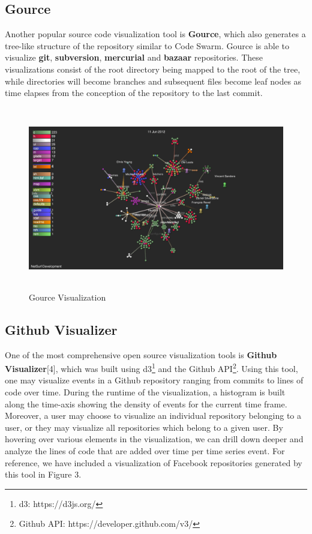 \documentclass{article}
\begin{document}
\subsection {Gource}

Another popular source code visualization tool is \textbf{Gource}, which also generates a tree-like structure of the repository similar to Code Swarm. Gource is able to visualize \textbf{git}, \textbf{subversion}, \textbf{mercurial} and \textbf{bazaar} repositories. These visualizations consist of the root directory being mapped to the root of the tree, while directories will become branches and subsequent files become leaf nodes as time elapses from the conception of the repository to the last commit. 

\begin{figure}[h!]
\centering
\includegraphics[height=8cm, width=12cm]{gource}
\caption{Gource Visualization}
\end{figure}

\subsection {Github Visualizer}

One of the most comprehensive open source visualization tools is \textbf{Github Visualizer}[4], which was built using d3\footnote{d3: https://d3js.org/} and the Github API\footnote{Github API: https://developer.github.com/v3/}. Using this tool, one may visualize events in a Github repository ranging from commits to lines of code over time. During the runtime of the visualization, a histogram is built along the time-axis showing the density of events for the current time frame. Moreover, a user may choose to visualize an individual repository belonging to a user, or they may visualize all repositories which belong to a given user. By hovering over various elements in the visualization, we can drill down deeper and analyze the lines of code that are added over time per time series event. For reference, we have included a visualization of Facebook repositories generated by this tool in Figure 3.
\end{document}
